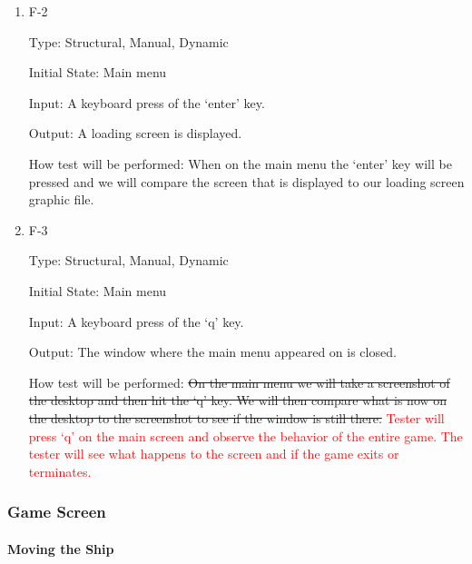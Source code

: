 \documentclass[12pt, titlepage]{article}
\begin{document}
\begin{enumerate}

\item{F-2\\}

Type: Structural, Manual, Dynamic

Initial State: Main menu

Input: A keyboard press of the `enter' key.

Output: A loading screen is displayed.

How test will be performed: When on the main menu the `enter' key will be pressed and we will compare the screen that is displayed to our loading screen graphic file.

\item{F-3\\}

Type: Structural, Manual, Dynamic

Initial State: Main menu

Input: A keyboard press of the `q' key.

Output: The window where the main menu appeared on is closed.

How test will be performed: \sout{On the main menu we will take a screenshot of the desktop and then hit the `q' key. We will then compare what is now on the desktop to the screenshot to see if the window is still there.} \textcolor{red}{Tester will press `q' on the main screen and observe the behavior of the entire game. The tester will see what happens to the screen and if the game exits or terminates.}

\end{enumerate}

\subsubsection{Game Screen}

\paragraph{Moving the Ship}
\end{document}
